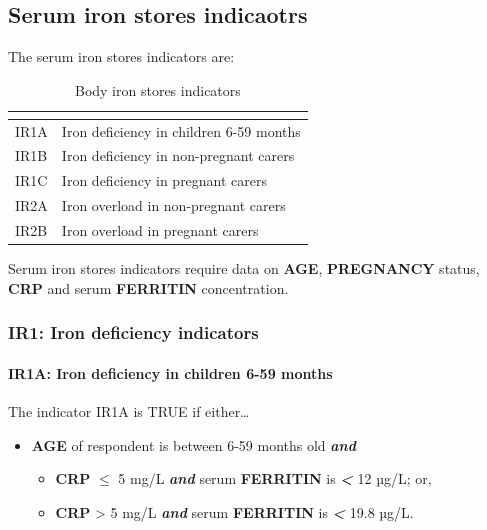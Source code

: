 \documentclass[12pt,a4paper]{article}
\let\oldparagraph\paragraph
\renewcommand{\paragraph}[1]{\oldparagraph{#1}\mbox{}}
\begin{document}
\newpage

\hypertarget{serum-iron-stores-indicaotrs}{%
\subsection{Serum iron stores indicaotrs}\label{serum-iron-stores-indicaotrs}}

The serum iron stores indicators are:

\begin{table}[H]

\caption{\label{tab:iron-deficiency}Body iron stores indicators}
\centering
\begin{tabular}[t]{ll}
\toprule
\textbf{} & \textbf{}\\
\midrule
\rowcolor{gray!6}  IR1A & Iron deficiency in children 6-59 months\\
IR1B & Iron deficiency in non-pregnant carers\\
\rowcolor{gray!6}  IR1C & Iron deficiency in pregnant carers\\
IR2A & Iron overload in non-pregnant carers\\
\rowcolor{gray!6}  IR2B & Iron overload in pregnant carers\\
\bottomrule
\end{tabular}
\end{table}

Serum iron stores indicators require data on \textbf{AGE}, \textbf{PREGNANCY} status, \textbf{CRP} and serum \textbf{FERRITIN} concentration.

\hypertarget{ir1-iron-deficiency-indicators}{%
\subsubsection{IR1: Iron deficiency indicators}\label{ir1-iron-deficiency-indicators}}

\hypertarget{ir1a-iron-deficiency-in-children-6-59-months}{%
\paragraph{IR1A: Iron deficiency in children 6-59 months}\label{ir1a-iron-deficiency-in-children-6-59-months}}

The indicator IR1A is TRUE if either\ldots{}

\begin{itemize}
\item
  \textbf{AGE} of respondent is between 6-59 months old \textbf{\emph{and}}

  \begin{itemize}
  \item
    \textbf{CRP} \textbf{\emph{\(\leq\)}} 5 mg/L \textbf{\emph{and}} serum \textbf{FERRITIN} is \textbf{\emph{\textless{}}} 12 µg/L; or,
  \item
    \textbf{CRP} \textgreater{} 5 mg/L \textbf{\emph{and}} serum \textbf{FERRITIN} is \textbf{\emph{\textless{}}} 19.8 µg/L.
  \end{itemize}
\end{itemize}
\end{document}
